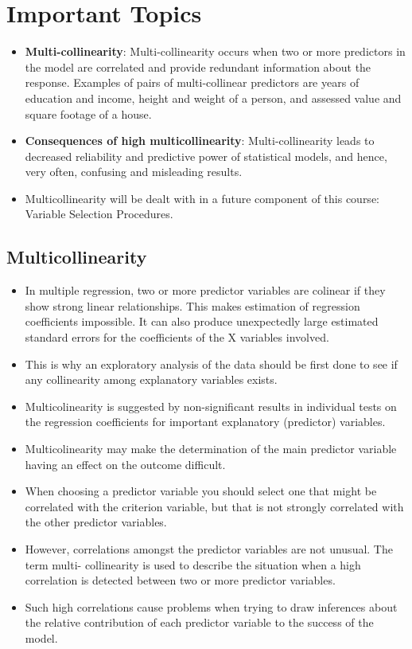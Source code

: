 \documentclass[a4paper,12pt]{article}
\begin{document}
\section{Important Topics}

\begin{itemize}
\item \textbf{Multi-collinearity}: Multi-collinearity occurs when two or more predictors in the model are
correlated and provide redundant information about the response. Examples of pairs of multi-collinear predictors are years of education and income, height and weight of a person, and assessed value and square footage
of a house.

\item \textbf{Consequences of high multicollinearity}:
Multi-collinearity leads to decreased reliability and predictive power of statistical models, and hence, very often, confusing and misleading results.
\item Multicollinearity will be dealt with in a future component of this course: Variable Selection Procedures.
\end{itemize}

\newpage
\subsection{Multicollinearity}
\begin{itemize}
\item In multiple regression, two or more predictor variables are colinear if they show strong
linear relationships. This makes estimation of regression coefficients impossible. It can
also produce unexpectedly large estimated standard errors for the coefficients of the X
variables involved.
\item This is why an exploratory analysis of the data should be first done to see if any collinearity
among explanatory variables exists.
\item Multicolinearity is suggested by non-significant results in individual tests on the regression
coefficients for important explanatory (predictor) variables.
\item Multicolinearity may make the determination of the main predictor variable having an
effect on the outcome difficult.
\item When choosing a predictor variable you should select one that might be correlated with
the criterion variable, but that is not strongly correlated with the other predictor variables.
\item However, correlations amongst the predictor variables are not unusual. The term multi-
collinearity is used to describe the situation when a high correlation is detected between
two or more predictor variables.
\item Such high correlations cause problems when trying to draw inferences about the relative
contribution of each predictor variable to the success of the model.
\end{itemize}
\end{document}
